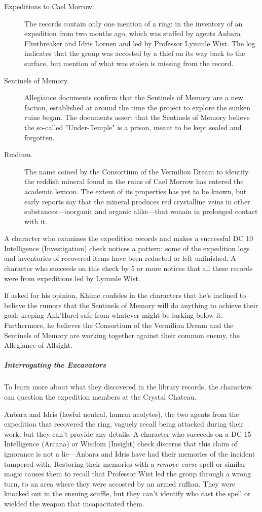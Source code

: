 \documentclass[10pt,a4paper,twoside,fancy,bg=print,twocolumn,openany,nodeprecatedcode]{dndbook}
\begin{document}
\begin{description}
\item[Expeditions to Cael Morrow.]
The records contain only one mention of a ring: in the inventory of an expedition from two months ago, which was staffed by agents Anbara Flintbreaker and Idris Lornen and led by Professor Lymmle Wist. The log indicates that the group was accosted by a thief on its way back to the surface, but mention of what was stolen is missing from the record.
\item[Sentinels of Memory.]
Allegiance documents confirm that the Sentinels of Memory are a new faction, established at around the time the project to explore the sunken ruins began. The documents assert that the Sentinels of Memory believe the so-called "Under-Temple" is a prison, meant to be kept sealed and forgotten.
\item[Ruidium.]
The name coined by the Consortium of the Vermilion Dream to identify the reddish mineral found in the ruins of Cael Morrow has entered the academic lexicon. The extent of its properties has yet to be known, but early reports say that the mineral produces red crystalline veins in other substances—inorganic and organic alike—that remain in prolonged contact with it.
\end{description}

A character who examines the expedition records and makes a successful DC 10 Intelligence (Investigation) check notices a pattern: some of the expedition logs and inventories of recovered items have been redacted or left unfinished. A character who succeeds on this check by 5 or more notices that all these records were from expeditions led by Lymmle Wist.

If asked for his opinion, Khime confides in the characters that he's inclined to believe the rumors that the Sentinels of Memory will do anything to achieve their goal: keeping Ank'Harel safe from whatever might be lurking below it. Furthermore, he believes the Consortium of the Vermilion Dream and the Sentinels of Memory are working together against their common enemy, the Allegiance of Allsight.

\subparagraph{Interrogating the Excavators}
To learn more about what they discovered in the library records, the characters can question the expedition members at the Crystal Chateau.

Anbara and Idris (lawful neutral, human acolytes), the two agents from the expedition that recovered the ring, vaguely recall being attacked during their work, but they can't provide any details. A character who succeeds on a DC 15 Intelligence (Arcana) or Wisdom (Insight) check discerns that this claim of ignorance is not a lie—Anbara and Idris have had their memories of the incident tampered with. Restoring their memories with a \textit{remove curse} spell or similar magic causes them to recall that Professor Wist led the group through a wrong turn, to an area where they were accosted by an armed ruffian. They were knocked out in the ensuing scuffle, but they can't identify who cast the spell or wielded the weapon that incapacitated them.
\end{document}
